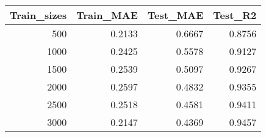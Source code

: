 \begin{tabular}{rrrr}
\toprule
Train_sizes & Train_MAE & Test_MAE & Test_R2 \\
\midrule
500 & 0.2133 & 0.6667 & 0.8756 \\
1000 & 0.2425 & 0.5578 & 0.9127 \\
1500 & 0.2539 & 0.5097 & 0.9267 \\
2000 & 0.2597 & 0.4832 & 0.9355 \\
2500 & 0.2518 & 0.4581 & 0.9411 \\
3000 & 0.2147 & 0.4369 & 0.9457 \\
\bottomrule
\end{tabular}
